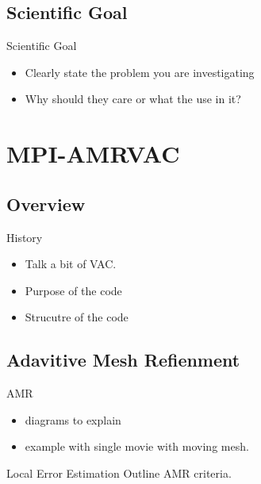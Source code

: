 \documentclass{beamer}
\begin{document}
\subsection{Scientific Goal}
\begin{frame}{Scientific Goal}
\begin{itemize}
\item Clearly state the problem you are investigating
\item Why should they care or what the use in it?
\end{itemize}
\end{frame}
\section{MPI-AMRVAC}
\subsection{Overview}
\begin{frame}
\begin{block}{History}
\begin{itemize}
\item Talk a bit of VAC.
\item Purpose of the code
\item Strucutre of the code
\end{itemize}
\end{block}
\end{frame}
\subsection{Adavitive Mesh Refienment}
\begin{frame}
\begin{block}{AMR}
\begin{itemize}
\item diagrams to explain
\item example with single movie with moving mesh.   
\end{itemize}
\end{block}
\end{frame}
\begin{frame}
\begin{block}{Local Error Estimation}
Outline AMR criteria.
\end{block}
\end{frame}
\end{document}
